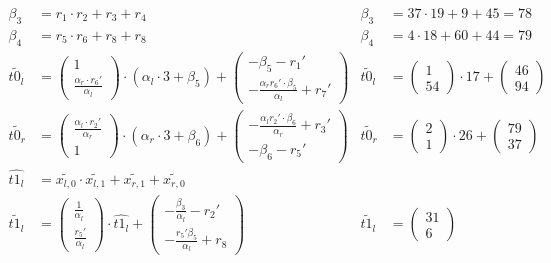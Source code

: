 \begin{align*}
%
\beta_3 &= r_1 \cdot r_2 + r_3 + r_4 & \beta_3 &= 37 \cdot 19 + 9 + 45 = 78\\
%
\beta_4 &= r_5 \cdot r_6 + r_8 + r_8 & \beta_4 &= 4 \cdot 18 + 60 + 44 = 79\\
%
\widetilde{t0_l} & =
\begin{pmatrix}
  1\\
  \frac{\alpha_r \cdot r_6'}{\alpha_l}
\end{pmatrix}
\cdot (\alpha_l \cdot 3 + \beta_5) +
\begin{pmatrix}
  -\beta_5-r_1'\\
  -\frac{\alpha_r r_6' \cdot \beta_5}{\alpha_l} + r_7'
\end{pmatrix}
&
\widetilde{t0_l} & =
\begin{pmatrix}1\\54\end{pmatrix}
\cdot 17 +
\begin{pmatrix}46\\94\end{pmatrix}\\
%
\widetilde{t0_r} & =
\begin{pmatrix}
  \frac{\alpha_l \cdot r_2'}{\alpha_r}\\
  1
\end{pmatrix}
\cdot (\alpha_r \cdot 3 + \beta_6) +
\begin{pmatrix}
  -\frac{\alpha_lr_2' \cdot \beta_6}{\alpha_r} + r_3'\\
  -\beta_6-r_5'
\end{pmatrix}
&
\widetilde{t0_r} & =
\begin{pmatrix}2\\1\end{pmatrix}
\cdot 26 +
\begin{pmatrix}79\\37\end{pmatrix}\\
%
\widehat{t1_l} &=
\widetilde{x_{l,0}} \cdot \widetilde{x_{l,1}} + \widetilde{x_{r,1}} +
\widetilde{x_{r,0}}\\
%
\widetilde{t1_l} &=
\begin{pmatrix}\frac{1}{\alpha_l}\\\frac{r_5'}{\alpha_l}\end{pmatrix}
\cdot \widehat{t1_l} +
\begin{pmatrix}-\frac{\beta_3}{\alpha_l}-r_2'\\-\frac{r_5'\beta_5}{\alpha_l} +
r_8\end{pmatrix}
&
\widetilde{t1_l} &=
\begin{pmatrix}31\\6\end{pmatrix}

\end{align*}
